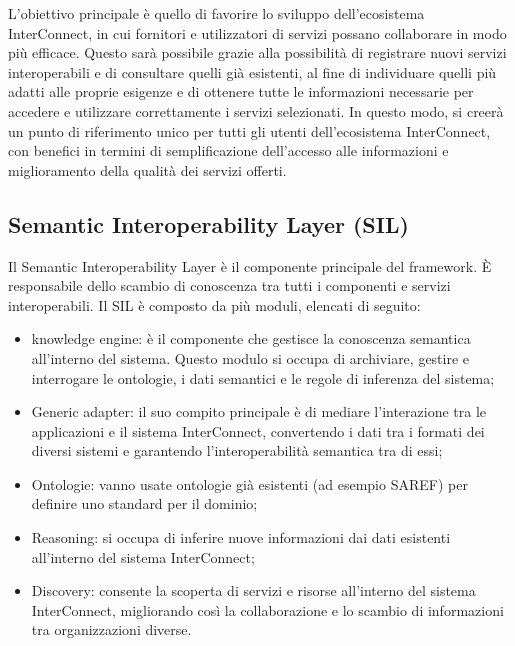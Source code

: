 L'obiettivo principale è quello di favorire lo sviluppo dell'ecosistema InterConnect, in cui fornitori e utilizzatori di servizi possano collaborare in modo più efficace. Questo sarà possibile grazie alla possibilità di registrare nuovi servizi interoperabili e di consultare quelli già esistenti, al fine di individuare quelli più adatti alle proprie esigenze e di ottenere tutte le informazioni necessarie per accedere e utilizzare correttamente i servizi selezionati. In questo modo, si creerà un punto di riferimento unico per tutti gli utenti dell'ecosistema InterConnect, con benefici in termini di semplificazione dell'accesso alle informazioni e miglioramento della qualità dei servizi offerti.


\subsection{Semantic Interoperability Layer (SIL)}
Il Semantic Interoperability Layer è il componente principale del framework. È responsabile dello scambio di conoscenza tra tutti i componenti e servizi interoperabili.
Il SIL è composto da più moduli, elencati di seguito:
\begin{itemize}
    \item knowledge engine: è il componente che gestisce la conoscenza semantica all'interno del sistema. Questo modulo si occupa di archiviare, gestire e interrogare le ontologie, i dati semantici e le regole di inferenza del sistema;
    \item Generic adapter: il suo compito principale è di mediare l'interazione tra le applicazioni e il sistema InterConnect, convertendo i dati tra i formati dei diversi sistemi e garantendo l'interoperabilità semantica tra di essi;
    \item Ontologie: vanno usate ontologie già esistenti (ad esempio SAREF) per definire uno standard per il dominio;
    \item Reasoning: si occupa di inferire nuove informazioni dai dati esistenti all'interno del sistema InterConnect;
    \item Discovery: consente la scoperta di servizi e risorse all'interno del sistema InterConnect, migliorando così la collaborazione e lo scambio di informazioni tra organizzazioni diverse.
\end{itemize}

